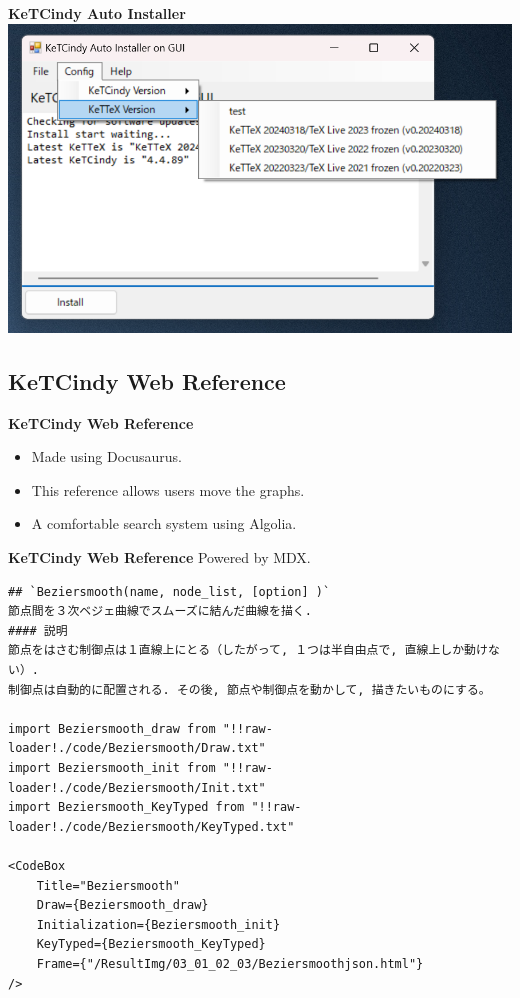 \documentclass[dvipdfmx, unicode]{beamer}
\begin{document}
\begin{frame}{\bfseries KeTCindy Auto Installer}
  \includegraphics[width=1.0\linewidth]{img/AutoInstaller/installer_1.png}
\end{frame}

\subsection{KeTCindy Web Reference}

\begin{frame}[t]{\bfseries KeTCindy Web Reference}
  \begin{itemize}
    \item Made using Docusaurus.
    \item This reference allows users move the graphs.
    \item A comfortable search system using Algolia.
  \end{itemize}
\end{frame}

\begin{frame}[fragile]{\bfseries KeTCindy Web Reference}
  Powered by MDX.
  \begin{lstlisting}
## `Beziersmooth(name, node_list, [option] )`
節点間を３次ベジェ曲線でスムーズに結んだ曲線を描く.
#### 説明
節点をはさむ制御点は１直線上にとる（したがって, １つは半自由点で, 直線上しか動けない）.
制御点は自動的に配置される. その後, 節点や制御点を動かして, 描きたいものにする。  

import Beziersmooth_draw from "!!raw-loader!./code/Beziersmooth/Draw.txt"
import Beziersmooth_init from "!!raw-loader!./code/Beziersmooth/Init.txt"
import Beziersmooth_KeyTyped from "!!raw-loader!./code/Beziersmooth/KeyTyped.txt"

<CodeBox 
    Title="Beziersmooth"
    Draw={Beziersmooth_draw}
    Initialization={Beziersmooth_init}
    KeyTyped={Beziersmooth_KeyTyped}
    Frame={"/ResultImg/03_01_02_03/Beziersmoothjson.html"}
/>
  \end{lstlisting}
\end{frame}
\end{document}
